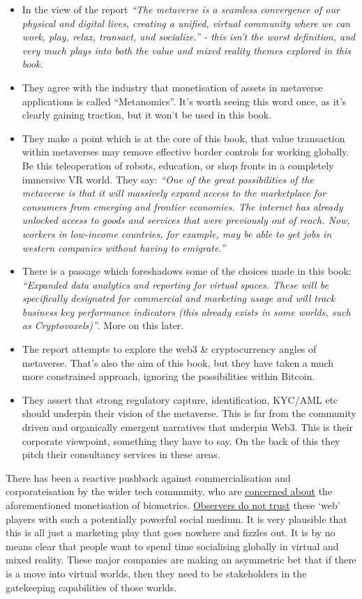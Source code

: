 \begin{itemize}
\item In the view of the report \textit{``The metaverse is a seamless convergence of our physical and digital lives, creating a unified, virtual community where we can work, play, relax, transact, and socialize.'' - this isn't the worst definition, and very much plays into both the value and mixed reality themes explored in this book.}
\item They agree with the industry that monetisation of assets in metaverse applications is called ``Metanomics''. It's worth seeing this word once, as it's clearly gaining traction, but it won't be used in this book.
\item They make a point which is at the core of this book, that value transaction within metaverses may remove effective border controls for working globally. Be this teleoperation of robots, education, or shop fronts in a completely immersive VR world. They say: \textit{``One of the great possibilities of the metaverse is that it will massively expand access to the marketplace for consumers from emerging and frontier economies. The internet has already unlocked access to goods and services that were previously out of reach. Now, workers in low-income countries, for example, may be able to get jobs in western companies without having to emigrate.''}
\item There is a passage which foreshadows some of the choices made in this book: \textit{``Expanded data analytics and reporting for virtual spaces. These will be specifically designated for commercial and marketing usage and will track business key performance indicators (this
already exists in some worlds, such as Cryptovoxels)''}. More on this later.
\item The report attempts to explore the web3 \& cryptocurrency angles of metaverse. That's also the aim of this book, but they have taken a much more constrained approach, ignoring the possibilities within Bitcoin.
\item They assert that strong regulatory capture, identification, KYC/AML etc should underpin their vision of the metaverse. This is far from the community driven and organically emergent narratives that underpin Web3. This is their corporate viewpoint, something they have to say. On the back of this they pitch their consultancy services in these areas.
\end{itemize}
There has been a reactive pushback against commercialisation and corporateisation by the wider tech community, who are \href{https://www.metaversethics.org/p/mde02-metaverse-data-privacy-1}{concerned about} the aforementioned monetisation of biometrics. \href{https://www.coindesk.com/layer2/2022/01/19/meta-leans-in-to-tracking-your-emotions-in-the-metaverse/}{Observers do not trust} these `web' players with such a potentially powerful social medium. It is very plausible that this is all just a marketing play that goes nowhere and fizzles out. It is by no means clear that people want to spend time socialising globally in virtual and mixed reality. These major companies are  making an asymmetric bet that if there is a move into virtual worlds, then they need to be stakeholders in the gatekeeping capabilities of those worlds.
